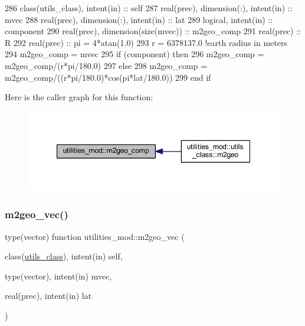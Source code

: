 \begin{DoxyCode}
286     \textcolor{keywordtype}{class}(utils\_class), \textcolor{keywordtype}{intent(in)} :: self
287     \textcolor{keywordtype}{real(prec)}, \textcolor{keywordtype}{dimension(:)}, \textcolor{keywordtype}{intent(in)} :: mvec
288     \textcolor{keywordtype}{real(prec)}, \textcolor{keywordtype}{dimension(:)}, \textcolor{keywordtype}{intent(in)} :: lat
289     \textcolor{keywordtype}{logical}, \textcolor{keywordtype}{intent(in)} :: component
290     \textcolor{keywordtype}{real(prec)}, \textcolor{keywordtype}{dimension(size(mvec))} :: m2geo\_comp
291     \textcolor{keywordtype}{real(prec)} :: R
292     \textcolor{keywordtype}{real(prec)} :: pi = 4*atan(1.0)
293     r = 6378137.0 \textcolor{comment}{!earth radius in meters}
294     m2geo\_comp = mvec
295     \textcolor{keywordflow}{if} (component) \textcolor{keywordflow}{then}
296         m2geo\_comp = m2geo\_comp/(r*pi/180.0)
297     \textcolor{keywordflow}{else}
298         m2geo\_comp = m2geo\_comp/((r*pi/180.0)*cos(pi*lat/180.0))
299 \textcolor{keywordflow}{    end if}
\end{DoxyCode}
Here is the caller graph for this function\+:\nopagebreak
\begin{figure}[H]
\begin{center}
\leavevmode
\includegraphics[width=347pt]{namespaceutilities__mod_ae6b8a45b229e3f1f8c2b12dd74e7a2dd_icgraph}
\end{center}
\end{figure}
\mbox{\label{namespaceutilities__mod_a70b21b18c8633b7fd4c3057530d3f16f}} 
\subsubsection{\texorpdfstring{m2geo\+\_\+vec()}{m2geo\_vec()}}
{\footnotesize\ttfamily type(vector) function utilities\+\_\+mod\+::m2geo\+\_\+vec (\begin{DoxyParamCaption}\item[{class(\mbox{\hyperlink{structutilities__mod_1_1utils__class}{utils\+\_\+class}}), intent(in)}]{self,  }\item[{type(vector), intent(in)}]{mvec,  }\item[{real(prec), intent(in)}]{lat }\end{DoxyParamCaption})\hspace{0.3cm}{\ttfamily [private]}}



